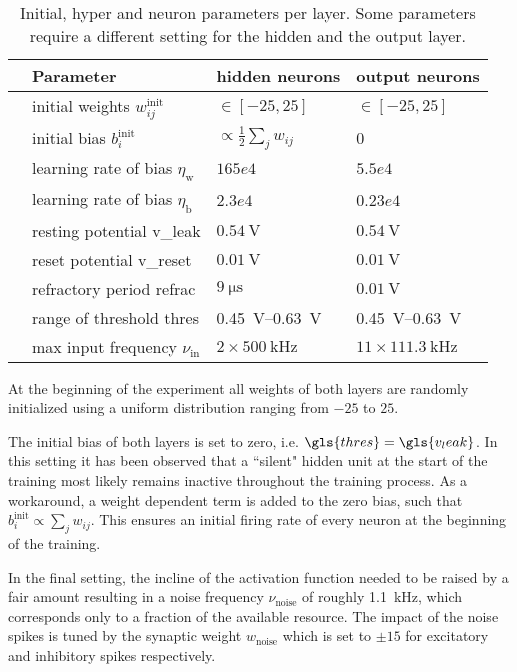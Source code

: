 \begin{table}[t!]\centering{}
	\begin{tabular}{@{}rlll@{}}\toprule
		& Parameter								& 	hidden neurons 			& 	output neurons 	\\ \midrule
		& initial weights $w_{ij}^\text{init}$	& 	 $\in[-25, 25]$			&	$\in[-25, 25]$	\\
		& initial bias $b_{i}^\text{init}$		& $\propto \frac{1}{2} \sum_j w_{ij}$ &	0		\\
		& learning rate of bias  $\eta_\text{w}$&	$165e4$					& 	$5.5e4$			\\
		& learning rate of bias  $\eta_\text{b}$&	$2.3e4$					& 	$0.23e4$		\\
		& resting potential \gls{v_leak}		&	$\SI{0.54}{\V}$ 		& 	$\SI{0.54}{\V}$	\\
		& reset potential \gls{v_reset}			&	$\SI{0.01}{\V}$			& 	$\SI{0.01}{\V}$	\\
		& refractory period \gls{refrac}		&	$\SI{9}{\micro \s}$			& 	$\SI{0.01}{\V}$	\\
		& range of threshold \gls{thres} 				&	\SIrange{0.45}{0.63}{\V}&	\SIrange{0.45}{0.63}{\V}\\
		& max input frequency $\nu_{\text{in}}$	&	$2 \times \SI{500}{\kilo \Hz}$	& $11 \times \SI{111.3}{\kilo\Hz}$	\\
		\bottomrule
	\end{tabular}
	\caption[Initial, hyper and neuron parameters per layer.]{Initial, hyper and neuron parameters per layer. Some parameters require a different setting for the hidden and the output layer.}
	\label{circlesinitparameters}
\end{table}

At the beginning of the experiment all weights of both layers are randomly initialized using a uniform distribution ranging from $-25$ to $25$. 

The initial bias of both layers is set to zero, i.e. $\gls{thres} = \gls{v_leak}$. In this setting it has been observed that a ``silent" hidden unit at the start of the training most likely remains inactive throughout the training process. As a workaround, a weight dependent term is added to the zero bias, such that $b_i^\text{init} \propto \sum_j w_{ij}$. This ensures an initial firing rate of every neuron at the beginning of the training.

In the final setting, the incline of the activation function needed to be raised by a fair amount resulting in a noise frequency $\nu_\text{noise}$ of roughly \SI{1.1}{\kilo \Hz}, which corresponds only to a fraction of the available resource. The impact of the noise spikes is tuned by the synaptic weight $w_\text{noise}$ which is set to $\pm 15$ for excitatory and inhibitory spikes respectively.

